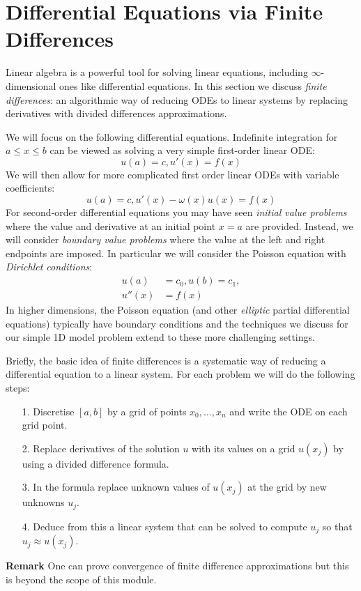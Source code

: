 
\section{Differential Equations via Finite Differences}
Linear algebra is a powerful tool for solving linear equations, including \ensuremath{\infty}-dimensional ones like differential equations. In this section we discuss \emph{finite differences}: an algorithmic way of reducing ODEs to linear systems by replacing derivatives with divided differences approximations. 

We will focus on the following differential equations. Indefinite integration for $a \ensuremath{\leq} x \ensuremath{\leq} b$ can be viewed as solving a very simple first-order linear ODE:
\[
u(a) = c, u'(x) = f(x)
\]
We will then allow for more complicated first order linear ODEs with variable coefficients:
\[
u(a) = c, u'(x) - \ensuremath{\omega}(x) u(x) = f(x)
\]
For second-order differential equations you may have seen \emph{initial value problems} where the value and derivative at an initial point $x=a$ are provided.  Instead, we will consider \emph{boundary value problems} where the value at the left and right endpoints are imposed. In particular we will consider the Poisson equation with \emph{Dirichlet conditions}:
\begin{align*}
u(a) &= c_0, u(b) = c_1, \\
u''(x) &= f(x)
\end{align*}
In higher dimensions, the Poisson equation (and other \emph{elliptic} partial differential equations) typically have boundary conditions and the techniques we discuss for our simple 1D model problem extend to these more challenging settings.

Briefly, the basic idea of finite differences is a systematic way of reducing a differential equation to a linear system. For each problem we will do the following steps:

\begin{itemize}
\item[1. ] Discretise $[a,b]$ by a grid of points $x_0,\ensuremath{\ldots},x_n$ and write the ODE on each grid point.


\item[2. ] Replace derivatives of the solution $u$ with its values on a grid $u(x_j)$ by using a divided difference formula.


\item[3. ] In the formula replace unknown values of $u(x_j)$ at the grid by new unknowns $u_j$.


\item[4. ] Deduce from this  a linear system that can be solved to compute $u_j$ so that $u_j \ensuremath{\approx} u(x_j)$. 

\end{itemize}
\textbf{Remark} One can prove convergence of finite difference approximations but this is beyond the scope of this module.

